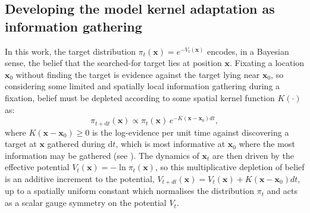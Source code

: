 \subsection{Developing the model kernel adaptation as information gathering}\label{subsec:information_as_potential}
In this work, the target distribution $\pi_t(\mathbf{x}) = e^{-V_t(\mathbf{x})}$ encodes, in a Bayesian sense, the belief that the searched-for target lies at position $\mathbf{x}$. Fixating a location $\mathbf{x}_0$ without finding the target is evidence against the target lying near $\mathbf{x}_0$, so considering some limited and spatially local information gathering during a fixation, belief must be depleted according to some spatial kernel function $K(\cdot)$ as:
\begin{equation*}
    \pi_{t+\mathrm{d}t}(\mathbf{x}) \propto \pi_t(\mathbf{x})\, e^{-K(\mathbf{x} - \mathbf{x}_0) dt},
\end{equation*}
where $K(\mathbf{x} - \mathbf{x}_0) \geq 0$ is the log-evidence per unit time against discovering a target at $\mathbf{x}$ gathered during $\mathrm{d}t$, which is most informative at $\mathbf{x}_0$ where the most information may be gathered (see \cite{bujia_modeling_2022, Ruarte2024.11.29.626088}). The dynamics of $\mathbf{x}_t$ are then driven by the effective potential $V_t(\mathbf{x}) = -\ln \pi_t(\mathbf{x})$, so this multiplicative depletion of belief is an additive increment to the potential, $V_{t+dt}(\mathbf{x}) = V_{t}(\mathbf{x}) + K(\mathbf{x}-\mathbf{x}_0)dt$, up to a spatially uniform constant which normalises the distribution $\pi_t$ and acts as a scalar gauge symmetry on the potential $V_t$. 

